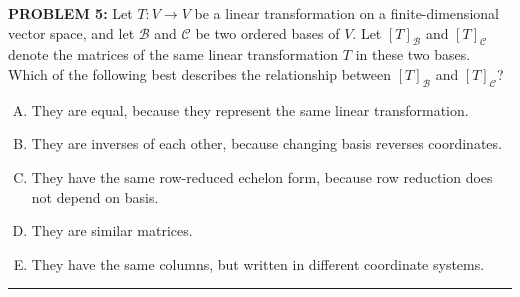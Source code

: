 \documentclass[12pt]{amsart}
\newcommand{\divider}{
  \vspace{-1em} %
  \noindent
  \raisebox{-0.15ex}{\textbullet}%
  \hspace{0.5em}%
  \rule[0.5ex]{0.95\textwidth}{1.0pt}%
  \hspace{0.5em}%
  \raisebox{-0.15ex}{\textbullet}%
  \vspace{0em} %
}
\begin{document}
{\bf PROBLEM 5:}
%
Let $T:V\to V$ be a linear transformation on a finite-dimensional vector space,
and let $\mathcal{B}$ and $\mathcal{C}$ be two ordered bases of $V$. Let
$[T]_{\mathcal{B}}$ and $[T]_{\mathcal{C}}$ denote the matrices of the same
linear transformation $T$ in these two bases.
%
Which of the following best describes the relationship between
$[T]_{\mathcal{B}}$ and $[T]_{\mathcal{C}}$?

\begin{enumerate}[(A)]
\item They are equal, because they represent the same linear transformation.
\item They are inverses of each other, because changing basis reverses coordinates.
\item They have the same row-reduced echelon form, because row reduction does not depend on basis.
\item They are similar matrices.
\item They have the same columns, but written in different coordinate systems.
\end{enumerate}

%
%
%
%
%
%
\divider
\end{document}
